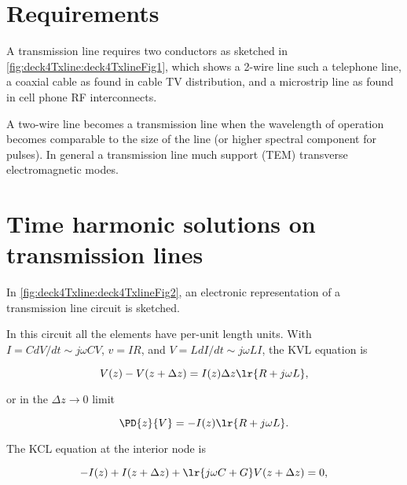 %
%
\section{Requirements}

A transmission line requires two conductors as sketched in \cref{fig:deck4Txline:deck4TxlineFig1}, which shows a 2-wire line such a telephone line, a coaxial cable as found in cable TV distribution, and a microstrip line as found in cell phone RF interconnects.


A two-wire line becomes a transmission line when the wavelength of operation becomes comparable to the size of the line (or higher spectral component for pulses).  In general a transmission line much support (TEM) transverse electromagnetic modes.

\section{Time harmonic solutions on transmission lines}

In \cref{fig:deck4Txline:deck4TxlineFig2}, an electronic representation of a transmission line circuit is sketched.


In this circuit all the elements have per-unit length units.  With \( I = C dV/dt \sim j \omega C V \), \( v = I R \), and \( V = L dI/dt \sim j \omega L I \), the KVL equation is

\begin{dmath}\label{eqn:uwaves4TransmissionLines:20}
V(z) - V(z + \Delta z) = I(z) \Delta z \lr{ R + j \omega L },
\end{dmath}

or in the \( \Delta z \rightarrow 0 \) limit

\begin{dmath}\label{eqn:uwaves4TransmissionLines:40}
\PD{z}{V} = -I(z) \lr{ R + j \omega L }.
\end{dmath}

The KCL equation at the interior node is

\begin{dmath}\label{eqn:uwaves4TransmissionLines:60}
-I(z) + I(z + \Delta z) + \lr{ j \omega C + G} V(z + \Delta z) = 0,
\end{dmath}

